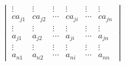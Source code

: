 \documentclass[
]{article}
\begin{document}
\begin{equation}
\begin{array}{ccccc}
\begin{vmatrix}
     \vdots        & \vdots   & \vdots     &  \vdots      & \vdots     & \vdots      \\  
    ca_{j1}        &ca_{j2}   &\cdots      &ca_{ji}       & \cdots     &ca_{jn}      \\
     \vdots        & \vdots   & \vdots     &  \vdots      & \vdots     & \vdots      \\  
     a_{j1}        & a_{j2}   & \cdots     & a_{ji}       & \cdots     & a_{jn}      \\
      \vdots       & \vdots   & \vdots     &  \vdots      & \vdots     & \vdots      \\
      a_{n1}        & a_{n2}   & \cdots     & a_{ni}       & \cdots     & a_{nn} 
  \end{vmatrix}
\end{array}
\end{equation}
\end{document}
